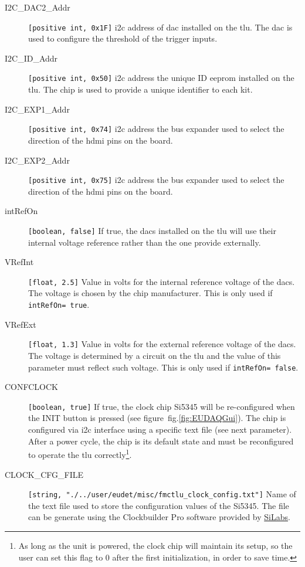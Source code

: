\begin{description}
  \item[I2C\_DAC2\_Addr] \verb|[positive int, 0x1F]| \gls{i2c} address of \gls{dac} installed on the \gls{tlu}. The \gls{dac} is used to configure the threshold of the trigger inputs.
  \item[I2C\_ID\_Addr] \verb|[positive int, 0x50]| \gls{i2c} address the unique ID \gls{eeprom} installed on the \gls{tlu}. The chip is used to provide a unique identifier to each kit.
  \item[I2C\_EXP1\_Addr] \verb|[positive int, 0x74]| \gls{i2c} address the bus expander used to select the direction of the \gls{hdmi} pins on the board.
  \item[I2C\_EXP2\_Addr] \verb|[positive int, 0x75]| \gls{i2c} address the bus expander used to select the direction of the \gls{hdmi} pins on the board.
  \item[intRefOn] \verb|[boolean, false]| If true, the \gls{dac}s installed on the \gls{tlu} will use their internal voltage reference rather than the one provide externally.
  \item[VRefInt] \verb|[float, 2.5]| Value in volts for the internal reference voltage of the \gls{dac}s. The voltage is chosen by the chip manufacturer. This is only used if \verb|intRefOn= true|.
  \item[VRefExt] \verb|[float, 1.3]| Value in volts for the external reference voltage of the \gls{dac}s. The voltage is determined by a circuit on the \gls{tlu} and the value of this parameter must reflect such voltage. This is only used if \verb|intRefOn= false|.
  \item[CONFCLOCK] \verb|[boolean, true]| If true, the clock chip Si5345 will be re-configured when the INIT button is pressed (see figure~fig.\ref{fig:EUDAQGui}). The chip is configured via \gls{i2c} interface using a specific text file (see next parameter). After a power cycle, the chip is its default state and must be reconfigured to operate the \gls{tlu} correctly\footnote{As long as the unit is powered, the clock chip will maintain its setup, so the user can set this flag to 0 after the first initialization, in order to save time.}.
  \item[CLOCK\_CFG\_FILE] \verb|[string, "./../user/eudet/misc/fmctlu_clock_config.txt"]| Name of the text file used to store the configuration values of the Si5345. The file can be generate using the Clockbuilder Pro software provided by \href{https://www.silabs.com/products/development-tools/software/clock}{SiLabs}.
\end{description}

